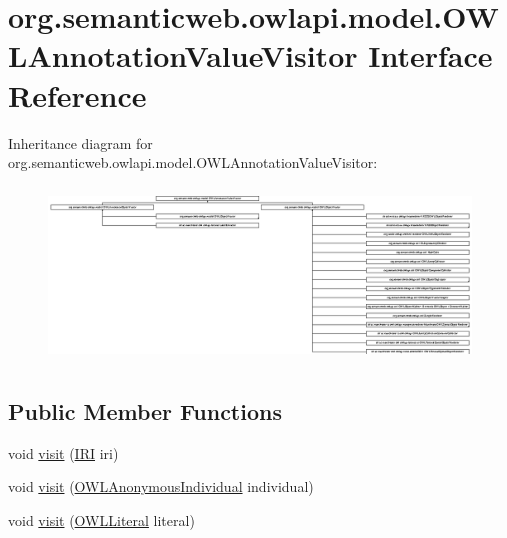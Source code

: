 \hypertarget{interfaceorg_1_1semanticweb_1_1owlapi_1_1model_1_1_o_w_l_annotation_value_visitor}{\section{org.\-semanticweb.\-owlapi.\-model.\-O\-W\-L\-Annotation\-Value\-Visitor Interface Reference}
\label{interfaceorg_1_1semanticweb_1_1owlapi_1_1model_1_1_o_w_l_annotation_value_visitor}
}
Inheritance diagram for org.\-semanticweb.\-owlapi.\-model.\-O\-W\-L\-Annotation\-Value\-Visitor\-:\begin{figure}[H]
\begin{center}
\leavevmode
\includegraphics[height=4.666667cm]{interfaceorg_1_1semanticweb_1_1owlapi_1_1model_1_1_o_w_l_annotation_value_visitor}
\end{center}
\end{figure}
\subsection*{Public Member Functions}
\begin{DoxyCompactItemize}
\item 
void \hyperlink{interfaceorg_1_1semanticweb_1_1owlapi_1_1model_1_1_o_w_l_annotation_value_visitor_a9722742232112cd1b52e66e03b8ab80d}{visit} (\hyperlink{classorg_1_1semanticweb_1_1owlapi_1_1model_1_1_i_r_i}{I\-R\-I} iri)
\item 
void \hyperlink{interfaceorg_1_1semanticweb_1_1owlapi_1_1model_1_1_o_w_l_annotation_value_visitor_a69e4d89e7e124deb0fc1684361283293}{visit} (\hyperlink{interfaceorg_1_1semanticweb_1_1owlapi_1_1model_1_1_o_w_l_anonymous_individual}{O\-W\-L\-Anonymous\-Individual} individual)
\item 
void \hyperlink{interfaceorg_1_1semanticweb_1_1owlapi_1_1model_1_1_o_w_l_annotation_value_visitor_ab2a977d615c57e44e9ac8e28035ccdf3}{visit} (\hyperlink{interfaceorg_1_1semanticweb_1_1owlapi_1_1model_1_1_o_w_l_literal}{O\-W\-L\-Literal} literal)
\end{DoxyCompactItemize}


